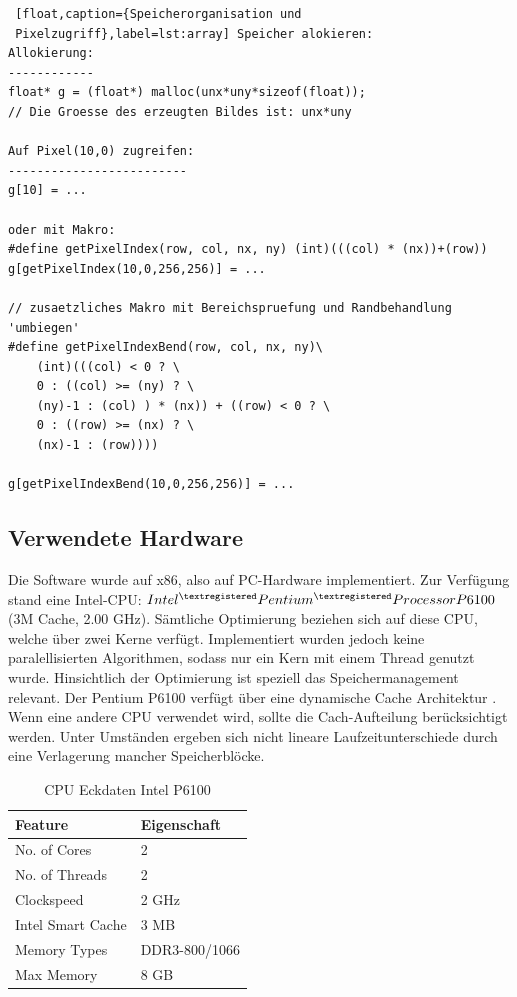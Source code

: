 \documentclass[a4paper,12pt]{article}
\begin{document}
 \begin{lstlisting} [float,caption={Speicherorganisation und
 Pixelzugriff},label=lst:array] Speicher alokieren:
Allokierung:
------------
float* g = (float*) malloc(unx*uny*sizeof(float));
// Die Groesse des erzeugten Bildes ist: unx*uny

Auf Pixel(10,0) zugreifen:
-------------------------
g[10] = ...
 
oder mit Makro:
#define getPixelIndex(row, col, nx, ny) (int)(((col) * (nx))+(row))
g[getPixelIndex(10,0,256,256)] = ...

// zusaetzliches Makro mit Bereichspruefung und Randbehandlung 'umbiegen'
#define getPixelIndexBend(row, col, nx, ny)\
	(int)(((col) < 0 ? \
	0 : ((col) >= (ny) ? \
	(ny)-1 : (col) ) * (nx)) + ((row) < 0 ? \
	0 : ((row) >= (nx) ? \
	(nx)-1 : (row))))

g[getPixelIndexBend(10,0,256,256)] = ...
\end{lstlisting}


\subsection{Verwendete Hardware}
Die Software wurde auf x86, also auf PC-Hardware implementiert. Zur Verfügung
stand eine Intel-CPU: $Intel^{\textregistered} Pentium^{\textregistered}
Processor P6100$ (3M Cache, 2.00 GHz). Sämtliche Optimierung beziehen
sich auf diese CPU, welche über zwei Kerne verfügt. Implementiert wurden jedoch
keine paralellisierten Algorithmen, sodass nur ein Kern mit einem Thread genutzt
wurde.
 Hinsichtlich der Optimierung ist speziell das Speichermanagement relevant. Der
 Pentium P6100 verfügt über eine dynamische Cache Architektur \cite{intel}. Wenn eine andere CPU verwendet wird, sollte die Cach-Aufteilung
berücksichtigt werden. Unter Umständen ergeben sich nicht lineare
Laufzeitunterschiede durch eine Verlagerung mancher Speicherblöcke.



\begin{table}[htbp]
\begin{center}
\begin{tabular}{ | l | l |}
\hline
Feature			& Eigenschaft \\ \hline
No. of Cores			&	2 \\
No. of Threads		&	2 \\
Clockspeed	&	2 GHz \\
Intel Smart Cache		&	3 MB \\
Memory Types		&	DDR3-800/1066 \\
Max Memory			&	8 GB \\ \hline
\end{tabular}
\caption{CPU Eckdaten Intel P6100\cite{intel}}
\label{tab:cpu}
\end{center}
\end{table}
\end{document}
